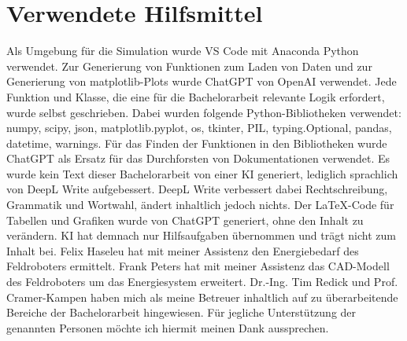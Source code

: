 \section{Verwendete Hilfsmittel}
Als Umgebung für die Simulation wurde VS Code mit Anaconda Python verwendet. Zur Generierung von Funktionen zum Laden von Daten und zur Generierung von matplotlib-Plots wurde ChatGPT von OpenAI verwendet. Jede Funktion und Klasse, die eine für die Bachelorarbeit relevante Logik erfordert, wurde selbst geschrieben. Dabei wurden folgende Python-Bibliotheken verwendet: numpy, scipy, json, matplotlib.pyplot, os, tkinter, PIL, typing.Optional, pandas, datetime, warnings. Für das Finden der Funktionen in den Bibliotheken wurde ChatGPT als Ersatz für das Durchforsten von Dokumentationen verwendet. Es wurde kein Text dieser Bachelorarbeit von einer KI generiert, lediglich sprachlich von DeepL Write aufgebessert. DeepL Write verbessert dabei Rechtschreibung, Grammatik und Wortwahl, ändert inhaltlich jedoch nichts. Der LaTeX-Code für Tabellen und Grafiken wurde von ChatGPT generiert, ohne den Inhalt zu verändern. KI hat demnach nur Hilfsaufgaben übernommen und trägt nicht zum Inhalt bei. Felix Haseleu hat mit meiner Assistenz den Energiebedarf des Feldroboters ermittelt. Frank Peters hat mit meiner Assistenz das CAD-Modell des Feldroboters um das Energiesystem erweitert. Dr.-Ing. Tim Redick und Prof. Cramer-Kampen haben mich als meine Betreuer inhaltlich auf zu überarbeitende Bereiche der Bachelorarbeit hingewiesen. Für jegliche Unterstützung der genannten Personen möchte ich hiermit meinen Dank aussprechen.
